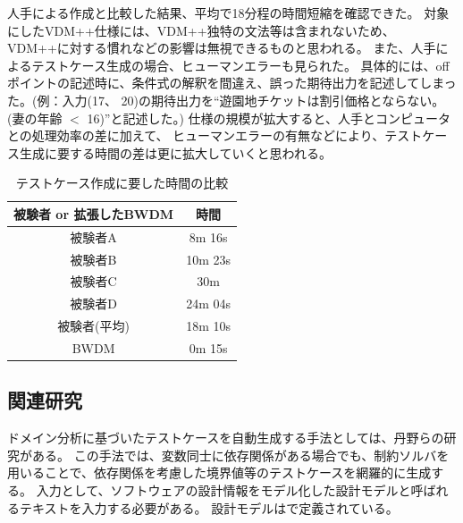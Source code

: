 \documentclass[uplatex, report, a4j, 10pt]{jsbook}
\begin{document}
人手による作成と比較した結果、平均で18分程の時間短縮を確認できた。
対象にしたVDM++仕様には、VDM++独特の文法等は含まれないため、
VDM++に対する慣れなどの影響は無視できるものと思われる。
また、人手によるテストケース生成の場合、ヒューマンエラーも見られた。
具体的には、offポイントの記述時に、条件式の解釈を間違え、誤った期待出力を記述してしまった。(例：入力(17、 20)の期待出力を“遊園地チケットは割引価格とならない。(妻の年齢 $<$ 16)”と記述した。)
仕様の規模が拡大すると、人手とコンピュータとの処理効率の差に加えて、
ヒューマンエラーの有無などにより、テストケース生成に要する時間の差は更に拡大していくと思われる。

\begin{table}[t]
  \begin{center}
    \caption{テストケース作成に要した時間の比較}
    \label{tab:time}
    \begin{tabular}{c|c}
      被験者 or 拡張したBWDM & 時間    \\
      \hline
      \hline
      被験者A                & 8m 16s  \\ \hline
      被験者B                & 10m 23s \\ \hline
      被験者C                & 30m     \\ \hline
      被験者D                & 24m 04s \\ \hline
      被験者(平均)           & 18m 10s \\ \hline
      BWDM                   & 0m 15s
    \end{tabular}
  \end{center}
\end{table}

\subsection{関連研究}

ドメイン分析に基づいたテストケースを自動生成する手法としては、丹野らの研究\cite{sekkeiModel}がある。
この手法では、変数同士に依存関係がある場合でも、制約ソルバ\cite{sat}を用いることで、依存関係を考慮した境界値等のテストケースを網羅的に生成する。
入力として、ソフトウェアの設計情報をモデル化した設計モデルと呼ばれるテキストを入力する必要がある。
設計モデルは\cite{sekkeiModel}で定義されている。
\end{document}
